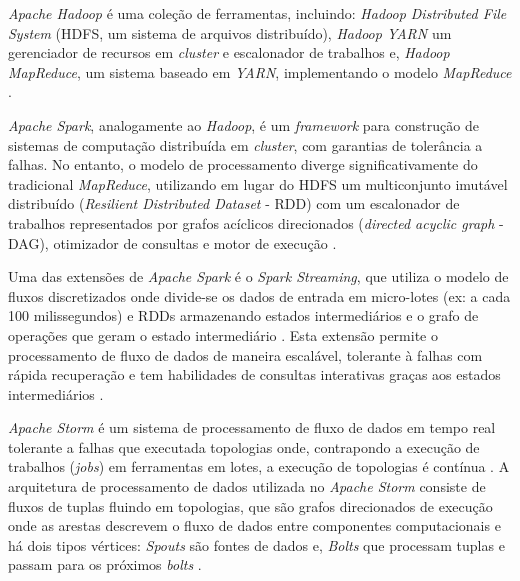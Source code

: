 \emph{Apache Hadoop} é uma coleção de ferramentas, incluindo: \emph{Hadoop
Distributed File System} (HDFS, um sistema de arquivos distribuído), \emph{Hadoop
YARN} um gerenciador de recursos em \emph{cluster} e escalonador de trabalhos e,
\emph{Hadoop MapReduce}, um sistema baseado em \emph{YARN}, implementando o modelo
\emph{MapReduce} \cite{ApacheHadoop2020}.

\emph{Apache Spark}, analogamente ao \emph{Hadoop}, é um \emph{framework} para
construção de sistemas de computação distribuída em \emph{cluster}, com garantias
de tolerância a falhas.
No entanto, o modelo de processamento diverge
significativamente do tradicional \emph{MapReduce}, utilizando em lugar do HDFS
um multiconjunto imutável distribuído (\emph{Resilient Distributed Dataset}
- RDD) com um escalonador de trabalhos representados por grafos acíclicos
direcionados (\emph{directed acyclic graph} - DAG), otimizador de consultas e
motor de execução \cite{ApacheSpark2020}.

Uma das extensões de \emph{Apache Spark} é o \emph{Spark Streaming}, que utiliza
o modelo de fluxos discretizados onde divide-se os dados de entrada em
micro-lotes (ex: a cada 100 milissegundos) e RDDs armazenando estados
intermediários e o grafo de operações que geram o estado intermediário
\cite{sparkStreaming2016}.
% 
Esta extensão permite o processamento de fluxo de dados de maneira escalável,
tolerante à falhas com rápida recuperação e tem habilidades de consultas
interativas graças aos estados intermediários
\cite{sparkStreaming2016,Lopez2018}.


% 
\emph{Apache Storm} é um sistema de processamento de fluxo de dados em tempo
real tolerante a falhas que executada topologias onde, contrapondo a execução de
trabalhos (\emph{jobs}) em ferramentas em lotes, a execução de topologias é
contínua \cite{toshniwal2014storm,Lopez2018,ApacheStorm2020}.
% 
A arquitetura de processamento de dados utilizada no \emph{Apache Storm}
consiste de fluxos de tuplas fluindo em topologias, que são grafos direcionados
de execução onde as arestas descrevem o fluxo de dados entre componentes
computacionais e há dois tipos vértices:
\emph{Spouts} são fontes de dados e,
\emph{Bolts} que processam tuplas e passam para os próximos \emph{bolts}
\cite{toshniwal2014storm}.

